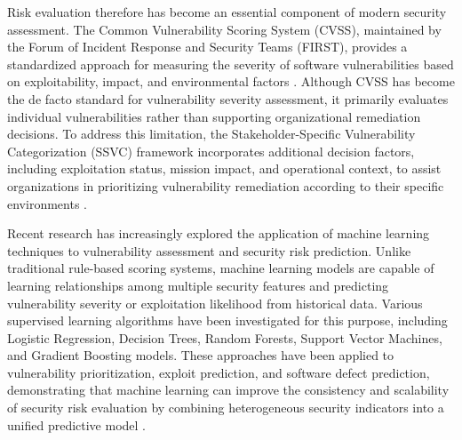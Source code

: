 Risk evaluation therefore has become an essential component of modern security assessment. The Common Vulnerability Scoring System (CVSS), maintained by the Forum of Incident Response and Security Teams (FIRST), provides a standardized approach for measuring the severity of software vulnerabilities based on exploitability, impact, and environmental factors \cite{FIRSTCVSSv40}. Although CVSS has become the de facto standard for vulnerability severity assessment, it primarily evaluates individual vulnerabilities rather than supporting organizational remediation decisions. To address this limitation, the Stakeholder-Specific Vulnerability Categorization (SSVC) framework incorporates additional decision factors, including exploitation status, mission impact, and operational context, to assist organizations in prioritizing vulnerability remediation according to their specific environments \cite{SSVC2023}.

Recent research has increasingly explored the application of machine learning techniques to vulnerability assessment and security risk prediction. Unlike traditional rule-based scoring systems, machine learning models are capable of learning relationships among multiple security features and predicting vulnerability severity or exploitation likelihood from historical data. Various supervised learning algorithms have been investigated for this purpose, including Logistic Regression, Decision Trees, Random Forests, Support Vector Machines, and Gradient Boosting models. These approaches have been applied to vulnerability prioritization, exploit prediction, and software defect prediction, demonstrating that machine learning can improve the consistency and scalability of security risk evaluation by combining heterogeneous security indicators into a unified predictive model \cite{Bozorgi2010BeyondHeuristics, Shin2013SoftwareMetrics, Rahman2019VulnerabilityPrediction}.